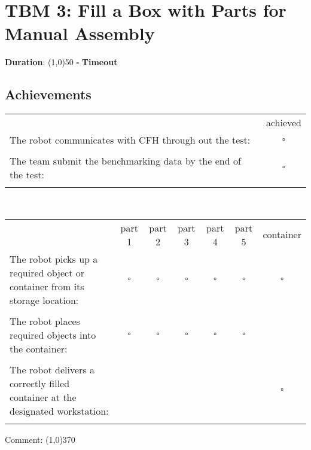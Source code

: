 \section*{TBM 3: Fill a Box with Parts for Manual Assembly}

\noindent \textbf{Duration}: \line(1,0){50} \hspace{0.5cm} $\square$ \textbf{Timeout}

\subsection*{Achievements}
\begin{tabular}{ p{7cm} c }
 & achieved  \\ 
The robot communicates with CFH through out the test: & $\square$ \\ \\
The team submit the benchmarking data by the end of the test: & $\square$ \\ \\
\end{tabular}
%
\\
%
\begin{tabular}{ p{7cm} c c c c c c}
 & part 1 & part 2 & part 3 & part 4 & part 5 & container \\ 
The robot picks up a required object or container from its storage location: & $\square$ & $\square$ & $\square$ & $\square$ & $\square$ & $\square$ \\ \\
The robot places required objects into the container: & $\square$ & $\square$ & $\square$ & $\square$ & $\square$ &   \\ \\
The robot delivers a correctly filled container at the designated workstation: & & & & & & $\square$ \\ \\
\end{tabular}

\vspace{0.2cm}
Comment: \line(1,0){370}
\vspace{0.6cm}

%


